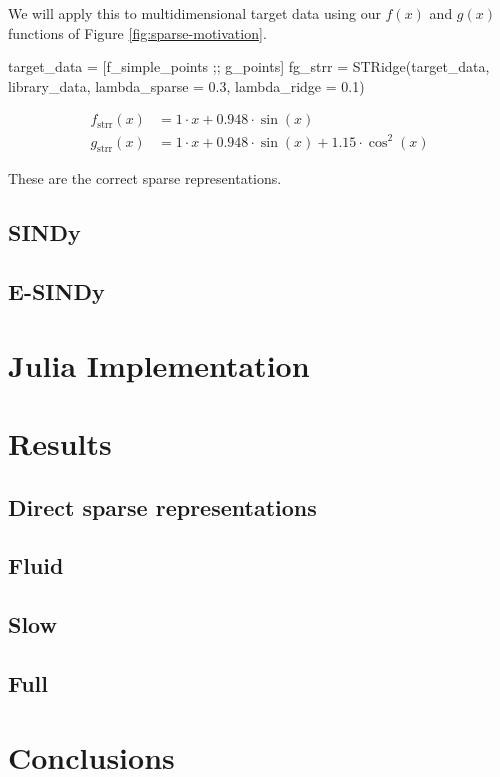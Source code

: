 \documentclass[
]{article}
\newenvironment{Shaded}{\begin{snugshade}}{\end{snugshade}}
\newcommand{\FloatTok}[1]{\textcolor[rgb]{0.68,0.00,0.00}{#1}}
\newcommand{\FunctionTok}[1]{\textcolor[rgb]{0.28,0.35,0.67}{#1}}
\newcommand{\NormalTok}[1]{\textcolor[rgb]{0.00,0.23,0.31}{#1}}
\newcommand{\OperatorTok}[1]{\textcolor[rgb]{0.37,0.37,0.37}{#1}}
\begin{document}
We will apply this to multidimensional target data using our \(f(x)\)
and \(g(x)\) functions of Figure \ref{fig:sparse-motivation}.

\begin{Shaded}
\begin{Highlighting}[]
\NormalTok{target\_data }\OperatorTok{=}\NormalTok{ [f\_simple\_points ;; g\_points]}
\NormalTok{fg\_strr }\OperatorTok{=} \FunctionTok{STRidge}\NormalTok{(target\_data, library\_data, lambda\_sparse }\OperatorTok{=} \FloatTok{0.3}\NormalTok{, lambda\_ridge }\OperatorTok{=} \FloatTok{0.1}\NormalTok{)}
\end{Highlighting}
\end{Shaded}

\begin{subequations} \label{eq:g-strr} \begin{align}    f_{\text{strr}}(x) &= 1 \cdot x + 0.948 \cdot \sin\left( x \right) \\
  g_{\text{strr}}(x) &= 1 \cdot x + 0.948 \cdot \sin\left( x \right) + 1.15 \cdot \cos^{2}\left( x \right) \end{align} \end{subequations}

These are the correct sparse representations.

\subsection{SINDy}\label{sindy}

\subsection{E-SINDy}\label{e-sindy}

\section{Julia Implementation}\label{julia-implementation}

\section{Results}\label{results}

\subsection{Direct sparse
representations}\label{direct-sparse-representations}

\subsection{Fluid}\label{fluid}

\subsection{Slow}\label{slow}

\subsection{Full}\label{full}

\section{Conclusions}\label{conclusions}


\printbibliography
\end{document}
